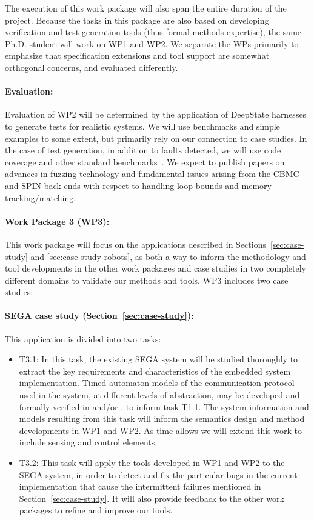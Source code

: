 The execution of this work package will also span the entire duration of the project.
Because the tasks in this package are also based on developing
verification and test generation tools (thus formal methods
expertise), the same Ph.D. student will work on WP1 and WP2.  We
separate the WPs primarily to emphasize that specification extensions
and tool support are somewhat orthogonal concerns, and evaluated differently.

\paragraph{Evaluation:} Evaluation of
WP2 will be determined by the application
of DeepState harnesses to generate tests for realistic
systems.  We will use benchmarks and simple examples to some
extent, but primarily rely on our connection to case studies.
In the case of test generation, in addition to faults
detected, we will use code coverage and other standard
benchmarks~\cite{FuzzerHicks}.  We expect to publish papers on
advances in fuzzing technology and
fundamental issues arising from the CBMC and SPIN back-ends with
respect to handling loop bounds and memory tracking/matching.

\paragraph{Work Package 3 (WP3):}  This work package will focus on the applications described in Sections~\ref{sec:case-study} and \ref{sec:case-study-robots}, as both a way to inform the methodology and tool developments in the other work packages and case studies in two completely different domains to validate our methods and tools.
WP3 includes two case studies:
\paragraph{SEGA case study (Section~\ref{sec:case-study}):} This application is divided into two tasks:
\noindent  \begin{itemize}[labelsep=3pt,leftmargin=12pt]
  \item T3.1: In this task, the existing SEGA system will be
    studied thoroughly to extract the key requirements and
    characteristics of the embedded system implementation.  Timed
    automaton models of the communication protocol used in the system,
    at different levels of abstraction, may be developed and formally
    verified in \uppaal and/or \prism, to inform task T1.1. The system information and models
    resulting from this task will inform the semantics design and method
    developments in WP1 and WP2. As time allows we will extend this work to include sensing
    and control elements.
  \item T3.2: This task will apply the tools developed in WP1 and WP2
    to the SEGA system, in order to detect and fix the particular bugs in the current
    implementation that cause the intermittent failures mentioned in
    Section~\ref{sec:case-study}.  It will also provide feedback to
    the other work packages to refine and improve our tools.
  \end{itemize}

